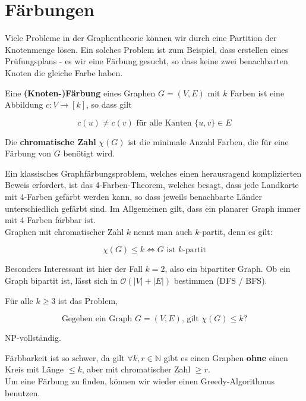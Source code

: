 \chapter{Färbungen}

Viele Probleme in der Graphentheorie können wir durch eine Partition der Knotenmenge lösen. Ein
solches Problem ist zum Beispiel, dass erstellen eines Prüfungsplans - es wir eine Färbung gesucht,
so dass keine zwei benachbarten Knoten die gleiche Farbe haben.

\begin{definition}
    Eine \textbf{(Knoten-)Färbung} eines Graphen $G = (V, E)$ mit $k$ Farben ist eine Abbildung
    $c: V \to [k]$, so dass gilt

    $$c(u) \neq c(v) \text{ für alle Kanten } \{u,v\} \in E$$

    Die \textbf{chromatische Zahl} $\chi (G)$ ist die minimale Anzahl Farben, die für eine Färbung
    von $G$ benötigt wird.
\end{definition}
\bigskip

Ein klassisches Graphfärbungsproblem, welches einen herausragend komplizierten Beweis erfordert, ist
das 4-Farben-Theorem, welches besagt, dass jede Landkarte mit 4-Farben gefärbt werden kann, so dass 
jeweils benachbarte Länder unterschiedlich gefärbt sind. Im Allgemeinen gilt, dass ein planarer
Graph immer mit 4 Farben färbbar ist. \\

Graphen mit chromatischer Zahl $k$ nennt man auch $k$-partit, denn es gilt:

$$\chi (G) \leq k \Leftrightarrow G \text{ ist $k$-partit}$$

Besonders Interessant ist hier der Fall $k = 2$, also ein bipartiter Graph. Ob ein Graph bipartit ist,
lässt sich in $\mathcal{O}(|V| + |E|)$ bestimmen (DFS / BFS).

\begin{satz}[Satz]
    Für alle $k \geq 3$ ist das Problem,

    $$\text{Gegeben ein Graph $G = (V, E)$, gilt $\chi (G) \leq k$?}$$

    NP-vollständig.
\end{satz}
\bigskip

Färbbarkeit ist so schwer, da gilt $\forall k,r \in \mathbb{N}$ gibt es einen Graphen \textbf{ohne}
einen Kreis mit Länge $\leq k$, aber mit chromatischer Zahl $\geq r$. \\

Um eine Färbung zu finden, können wir wieder einen Greedy-Algorithmus benutzen.

